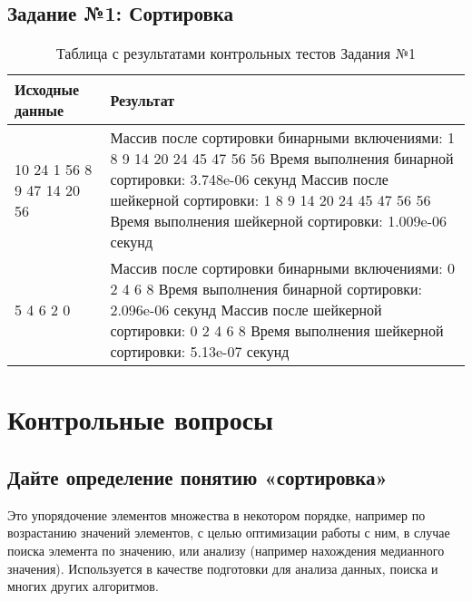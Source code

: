 \documentclass[a4paper,12pt]{article}
\begin{document}
	\subsection{Задание №1: Сортировка}
	\begin{table}[ht]
		\centering
		\begin{tabularx}{\textwidth}{|X|X|}
			\hline
			\textbf{Исходные данные} & \textbf{Результат} \\ \hline
			10 \newline 45  24  1  56  8  9  47  14  20  56  & 
			Массив после сортировки бинарными включениями: 1 8 9 14 20 24 45 47 56 56 \newline
			Время выполнения бинарной сортировки: 3.748e-06 секунд \newline
			Массив после шейкерной сортировки: 1 8 9 14 20 24 45 47 56 56 \newline
			Время выполнения шейкерной сортировки: 1.009e-06 секунд \newline
			    \\ \hline
			5 \newline  8  4  6  2  0 &
			Массив после сортировки бинарными включениями: 0 2 4 6 8 \newline
			Время выполнения бинарной сортировки: 2.096e-06 секунд \newline
			Массив после шейкерной сортировки: 0 2 4 6 8 \newline
			Время выполнения шейкерной сортировки: 5.13e-07 секунд \newline
			    \\ \hline
		\end{tabularx}
		\caption{Таблица с результатами контрольных тестов Задания №1}
	\end{table}
	
	\newpage
	\section{Контрольные вопросы}
	\subsection{Дайте определение понятию «сортировка»}
	
	Это упорядочение элементов множества в некотором порядке, например по возрастанию значений элементов, с целью оптимизации работы с ним, в случае поиска элемента по значению, или анализу (например нахождения медианного значения). Используется в качестве подготовки для анализа данных, поиска и многих других алгоритмов.     
	
\end{document}
